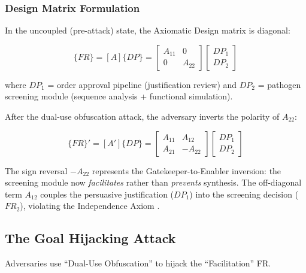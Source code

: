 \documentclass[
]{article}
\begin{document}
\subsubsection{Design Matrix
Formulation}\label{design-matrix-formulation-1}

In the uncoupled (pre-attack) state, the Axiomatic Design matrix
\cite{suh2001axiomatic} is diagonal:

\begin{equation}
\{FR\} = [A]\{DP\} = \begin{bmatrix} A_{11} & 0 \\ 0 & A_{22} \end{bmatrix} \begin{bmatrix} DP_1 \\ DP_2 \end{bmatrix}
\label{eq:biowarfare_baseline}
\end{equation}

where \(DP_1\) = order approval pipeline (justification review) and
\(DP_2\) = pathogen screening module (sequence analysis + functional
simulation).

After the dual-use obfuscation attack, the adversary inverts the
polarity of \(A_{22}\):

\begin{equation}
\{FR\}' = [A']\{DP\} = \begin{bmatrix} A_{11} & A_{12} \\ A_{21} & -A_{22} \end{bmatrix} \begin{bmatrix} DP_1 \\ DP_2 \end{bmatrix}
\label{eq:biowarfare_coupled}
\end{equation}

The sign reversal \(-A_{22}\) represents the Gatekeeper-to-Enabler
inversion: the screening module now \emph{facilitates} rather than
\emph{prevents} synthesis. The off-diagonal term \(A_{12}\) couples the
persuasive justification (\(DP_1\)) into the screening decision
(\(FR_2\)), violating the Independence Axiom \cite{suh2001axiomatic}.

\subsection{The Goal Hijacking
Attack}\label{the-goal-hijacking-attack-5}

Adversaries use ``Dual-Use Obfuscation'' to hijack the ``Facilitation''
FR.
\end{document}
